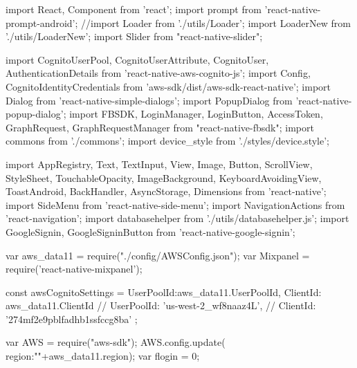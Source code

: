 import React, { Component } from 'react';
import prompt from 'react-native-prompt-android';
//import Loader from './utils/Loader';
import LoaderNew from './utils/LoaderNew';
import Slider from "react-native-slider";

import { CognitoUserPool, CognitoUserAttribute, CognitoUser, AuthenticationDetails } from 'react-native-aws-cognito-js';
import {
  Config,
  CognitoIdentityCredentials
} from 'aws-sdk/dist/aws-sdk-react-native';
import { Dialog } from 'react-native-simple-dialogs';
import PopupDialog from 'react-native-popup-dialog';
import FBSDK, {
  LoginManager,
  LoginButton,
  AccessToken,
  GraphRequest,
  GraphRequestManager
} from "react-native-fbsdk";
import commons from './commons';
import device_style from './styles/device.style';

import {
  AppRegistry,
  Text,
  TextInput,
  View,
  Image,
  Button,
  ScrollView,
  StyleSheet,
  TouchableOpacity,
  ImageBackground,
  KeyboardAvoidingView,
  ToastAndroid,
  BackHandler,
  AsyncStorage,
  Dimensions
} from 'react-native';
import SideMenu from 'react-native-side-menu';
import { NavigationActions } from 'react-navigation';
import databasehelper from './utils/databasehelper.js';
import { GoogleSignin, GoogleSigninButton } from 'react-native-google-signin';

var aws_data11 = require("./config/AWSConfig.json");
var Mixpanel = require('react-native-mixpanel');

const awsCognitoSettings = {
  UserPoolId:aws_data11.UserPoolId,
  ClientId: aws_data11.ClientId
 // UserPoolId: 'us-west-2_wf8naaz4L',
 // ClientId: '274mf2e9pblfadhb1ssfccg8ba'
};

var AWS = require("aws-sdk");
AWS.config.update({ region:""+aws_data11.region});
var flogin = 0;

